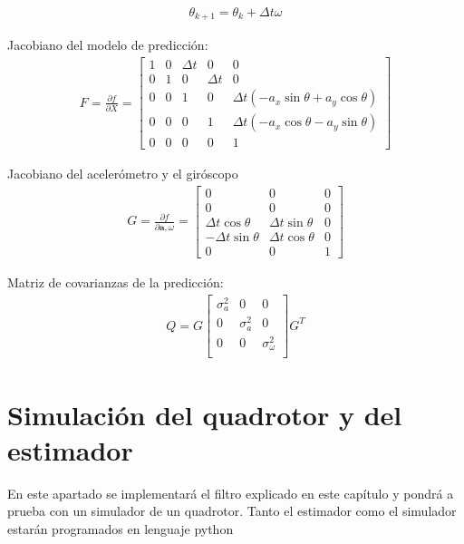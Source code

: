 \begin{align}
\theta_{k+1} = \theta_k + \Delta t \omega
\end{align}


Jacobiano del modelo de predicción:
\begin{align}
F = \frac{\partial f}{\partial X} =  
\begin{bmatrix} 
1 	&0	&\Delta t	&0		&0\\
0 	&1	&0		&\Delta t	&0\\
0 	&0	&1		&0		&\Delta t\left(-a_x\sin{\theta} + a_y\cos{\theta}\right) \\
0 	&0	&0		&1		&\Delta t\left(-a_x\cos{\theta} - a_y\sin{\theta}\right) \\
0 	&0	&0		&0		&1
\end{bmatrix}
\end{align}

Jacobiano del acelerómetro y el giróscopo
\begin{align}
G =  \frac{\partial f}{\partial \bm{a},\omega} = 
\begin{bmatrix} 
0 			&0			&0\\
0 			&0			&0\\
\Delta t \cos{\theta} 	&\Delta t \sin{\theta}	&0\\
-\Delta t \sin{\theta} 	&\Delta t \cos{\theta}	&0\\
0 			&0			&1		
\end{bmatrix}
\end{align}

Matriz de covarianzas de la predicción:
\begin{align}
Q = 
G
\begin{bmatrix} 
\sigma^2_a 	& 0 		& 0\\
0 		& \sigma^2_a 	& 0\\
0 		& 0 		& \sigma^2_\omega\\
\end{bmatrix}
G^T
\end{align}

\section{Simulación del quadrotor y del estimador}
En este apartado se implementará el filtro explicado en este capítulo y pondrá a prueba con un simulador de un quadrotor. Tanto el estimador como el simulador estarán programados en lenguaje python


\endinput
